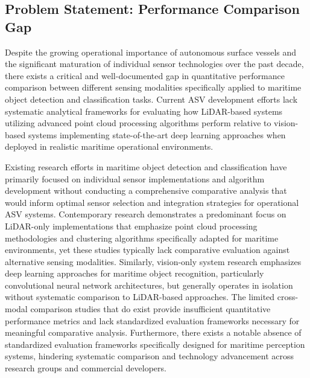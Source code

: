 \documentclass{erauthesis}
\begin{document}
\subsection{Problem Statement: Performance Comparison Gap} \label{problem_statement1}

Despite the growing operational importance of autonomous surface vessels and the significant maturation of individual sensor technologies over the past decade, there exists a critical and well-documented gap in quantitative performance comparison between different sensing modalities specifically applied to maritime object detection and classification tasks. Current \ac{ASV} development efforts lack systematic analytical frameworks for evaluating how \ac{LiDAR}-based systems utilizing advanced point cloud processing algorithms perform relative to vision-based systems implementing state-of-the-art deep learning approaches when deployed in realistic maritime operational environments.

Existing research efforts in maritime object detection and classification have primarily focused on individual sensor implementations and algorithm development without conducting a comprehensive comparative analysis that would inform optimal sensor selection and integration strategies for operational \ac{ASV} systems. Contemporary research demonstrates a predominant focus on \ac{LiDAR}-only implementations that emphasize point cloud processing methodologies and clustering algorithms specifically adapted for maritime environments, yet these studies typically lack comparative evaluation against alternative sensing modalities. Similarly, vision-only system research emphasizes deep learning approaches for maritime object recognition, particularly convolutional neural network architectures, but generally operates in isolation without systematic comparison to \ac{LiDAR}-based approaches. The limited cross-modal comparison studies that do exist provide insufficient quantitative performance metrics and lack standardized evaluation frameworks necessary for meaningful comparative analysis. Furthermore, there exists a notable absence of standardized evaluation frameworks specifically designed for maritime perception systems, hindering systematic comparison and technology advancement across research groups and commercial developers.
\end{document}
